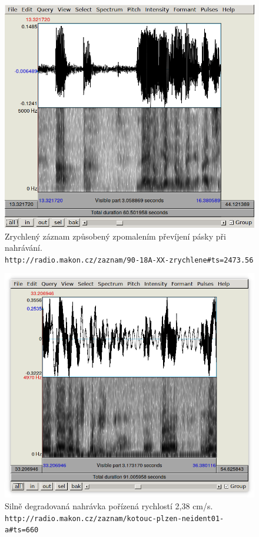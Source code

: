 
\begin{figure}[htpb]
\includegraphics[scale=0.89]{rc/spectrum-accel-90-18A.png}
\caption{
    Zrychlený záznam způsobený zpomalením převíjení pásky při nahrávání.\\
    \texttt{http://radio.makon.cz/zaznam/90-18A-XX-zrychlene\#ts=2473.56}
}
\label{fig:spectr-accel}
\end{figure}

\begin{figure}[htpb]
\includegraphics[scale=0.89]{rc/spectrum-2cms-ktplzneid01a.png}
\caption{
    Silně degradovaná nahrávka pořízená rychlostí 2,38 cm/s.\\
    \texttt{http://radio.makon.cz/zaznam/kotouc-plzen-neident01-a\#ts=660}
}
\label{fig:spectr-2cms}
\end{figure}


